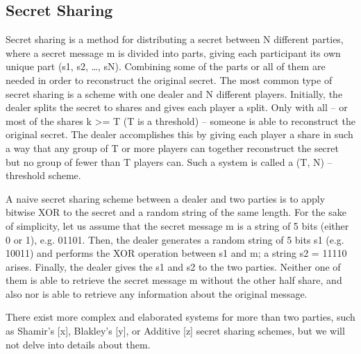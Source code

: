 \subsection{Secret Sharing}
Secret sharing is a method  for distributing a secret between N different parties, where a secret message m is divided into parts, giving each participant its own unique part (s1, s2, …, sN).
Combining some of the parts or all of them are needed in order to reconstruct the original secret. The most common type of secret sharing is a scheme with one dealer and N different players.
Initially, the dealer splits the secret to shares and gives each player a split. Only with all – or most of the shares k >= T  (T is a threshold) – someone is able to reconstruct the original secret.
The dealer accomplishes this by giving each player a share in such a way that any group of T or more players can together reconstruct the secret but no group of fewer than T players can. Such a system is called a (T, N) – threshold scheme.

A naive secret sharing scheme between a dealer and two parties is to apply bitwise XOR to the secret and a random string of the same length.
For the sake of simplicity, let us assume that the secret message m is a string of 5 bits (either 0 or 1), e.g. 01101.
Then, the dealer generates a random string of 5 bits s1 (e.g. 10011) and performs the XOR operation between s1 and m; a string s2 = 11110 arises.
Finally, the dealer gives the s1 and s2 to the two parties.
Neither one of them is able to retrieve the secret message m without the other half share, and also nor is able to retrieve any information about the original message.

There exist more complex and elaborated systems for more than two parties, such as Shamir’s [x], Blakley’s [y], or Additive [z] secret sharing schemes, but we will not delve into details about them.
